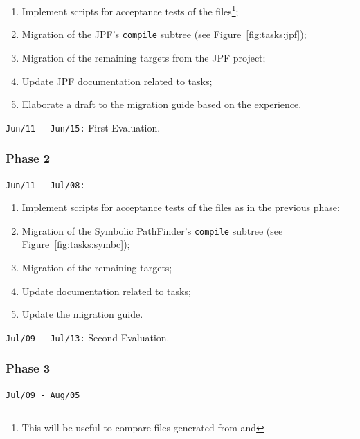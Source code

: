\documentclass{article}
\begin{document}
\begin{enumerate}
\item Implement scripts for acceptance tests of the \jpfcore{} \jar{}
      files\footnote{This will be useful to compare \jar{} files generated from
      \gradle{} and \ant{}};
\item Migration of the JPF's \texttt{compile} subtree (see
      Figure~\ref{fig:tasks:jpf});
\item Migration of the remaining \ant{} targets from the JPF project;
\item Update JPF documentation related to \ant{} tasks;
\item Elaborate a draft to the migration guide based on the experience.
\end{enumerate}

\noindent\texttt{Jun/11 - Jun/15:} First Evaluation.

\subsubsection*{Phase 2}
\noindent\texttt{Jun/11 - Jul/08:}

\begin{enumerate}
\item Implement scripts for acceptance tests of the \jpfsymbc{} \jar{} files as
      in the previous phase;
\item Migration of the Symbolic PathFinder's \texttt{compile} subtree (see
      Figure~\ref{fig:tasks:symbc});
\item Migration of the remaining \ant{} targets;
\item Update documentation related to \ant{} tasks;
\item Update the migration guide.
\end{enumerate}

\noindent\texttt{Jul/09 - Jul/13:} Second Evaluation.

\subsubsection*{Phase 3}
\noindent\texttt{Jul/09 - Aug/05}
\end{document}
